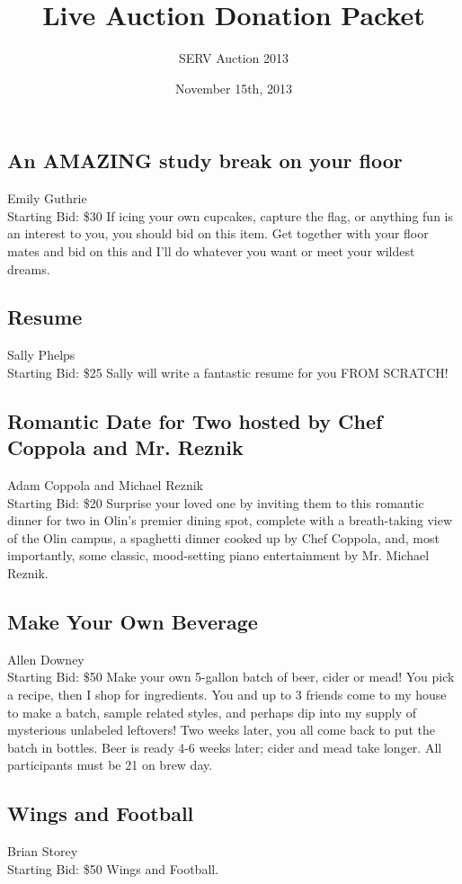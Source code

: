 \documentclass[11pt]{article}
\title{Live Auction Donation Packet}
\author{SERV Auction 2013}
\date{November 15th, 2013}
\begin{document}
\maketitle
\subsection{An AMAZING study break on your floor}
Emily Guthrie
\\
Starting Bid: \$30
\newline
If icing your own cupcakes, capture the flag, or anything fun is an interest to you, you should bid on this item. Get together with your floor mates and bid on this and I'll do whatever you want or meet your wildest dreams.
\subsection{Resume}
Sally Phelps
\\
Starting Bid: \$25
\newline
Sally will write a fantastic resume for you FROM SCRATCH!
\subsection{Romantic Date for Two hosted by Chef Coppola and Mr. Reznik}
Adam Coppola and Michael Reznik
\\
Starting Bid: \$20
\newline
Surprise your loved one by inviting them to this romantic dinner for two in Olin's premier dining spot, complete with a breath-taking view of the Olin campus, a spaghetti dinner cooked up by Chef Coppola, and, most importantly, some classic, mood-setting piano entertainment by Mr. Michael Reznik.
\subsection{Make Your Own Beverage}
Allen Downey
\\
Starting Bid: \$50
\newline
Make your own 5-gallon batch of beer, cider or mead! You pick a recipe, then I shop for ingredients.  You and up to 3 friends come to my house to make a batch, sample related styles, and perhaps dip into my supply of mysterious unlabeled leftovers! Two weeks later, you all come back to put the batch in bottles. Beer is ready 4-6 weeks later; cider and mead take longer.  All participants must be 21 on brew day.
\subsection{Wings and Football}
Brian Storey
\\
Starting Bid: \$50
\newline
Wings and Football.  
\end{document}
